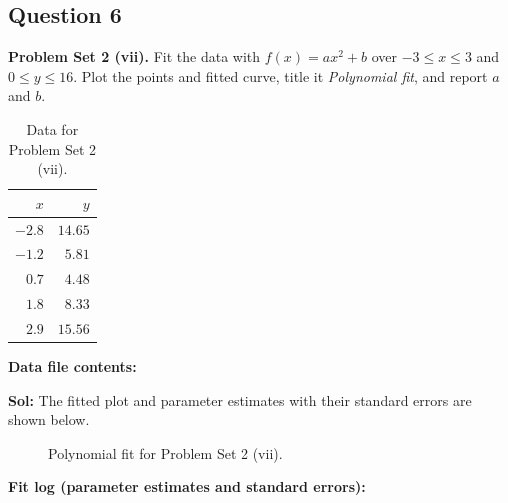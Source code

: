 \documentclass{book}
\begin{document}
\subsection*{Question 6}
\noindent\textbf{Problem Set 2 (vii).} Fit the data with $f(x)=ax^2+b$ over $-3\le x\le3$ and $0\le y\le16$. Plot the points and fitted curve, title it \textit{Polynomial fit}, and report $a$ and $b$.
\begin{table}[H]
\centering
\caption{Data for Problem Set 2 (vii).}
\begin{tabular}{|r|r|}
\hline
$x$ & $y$ \\ \hline
$-2.8$ & $14.65$ \\ \hline
$-1.2$ & $5.81$ \\ \hline
$0.7$ & $4.48$ \\ \hline
$1.8$ & $8.33$ \\ \hline
$2.9$ & $15.56$ \\ \hline
\end{tabular}
\end{table}
\noindent\textbf{Data file contents:}

\noindent\textbf{Sol:} The fitted plot and parameter estimates with their standard errors are shown below.

\begin{figure}[H]
    \centering
    
    \caption{Polynomial fit for Problem Set 2 (vii).}
\end{figure}
\noindent\textbf{Fit log (parameter estimates and standard errors):}

\newpage
\end{document}
